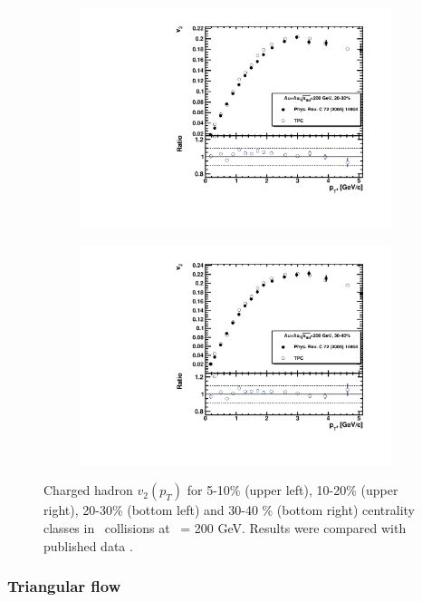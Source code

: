 \begin{figure}[ht]
\begin{subfigure}{.49\textwidth}
        \includegraphics[width=1.\linewidth]{Figures/v2_charged_hadrons_pt_cent3.pdf}
    \end{subfigure}
    \begin{subfigure}{.49\textwidth}
        \centering
        \includegraphics[width=1.\linewidth]{Figures/v2_charged_hadrons_pt_cent4.pdf}
    \end{subfigure}
    \label{fig:v2_EP_CH}
    \caption{Charged hadron $v_2(p_T)$ for 5-10\% (upper left), 10-20\% (upper right), 20-30\% (bottom left) and 30-40 \% (bottom right) centrality classes in \AuAu\ collisions at \sNN\ = 200 GeV. Results were compared with published data \cite{Adams:2004bi}.}
\end{figure}

\FloatBarrier
\subsubsection{Triangular flow}


